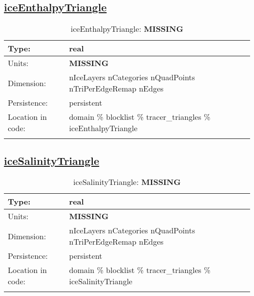 \subsection[iceEnthalpyTriangle]{\hyperref[sec:var_tab_tracer_triangles]{iceEnthalpyTriangle}}
\label{subsec:var_sec_tracer_triangles_iceEnthalpyTriangle}
\begin{center}
\begin{longtable}{| p{2.0in} | p{4.0in} |}
        \hline 
        Type: & real \\
        \hline 
        Units: & {\bf \color{red} MISSING} \\
        \hline 
        Dimension: & nIceLayers nCategories nQuadPoints nTriPerEdgeRemap nEdges \\
        \hline 
        Persistence: & persistent \\
        \hline 
         Location in code: & domain \% blocklist \% tracer\_triangles \% iceEnthalpyTriangle \\
         \hline 
    \caption{iceEnthalpyTriangle: {\bf \color{red} MISSING}}
\end{longtable}
\end{center}
\subsection[iceSalinityTriangle]{\hyperref[sec:var_tab_tracer_triangles]{iceSalinityTriangle}}
\label{subsec:var_sec_tracer_triangles_iceSalinityTriangle}
\begin{center}
\begin{longtable}{| p{2.0in} | p{4.0in} |}
        \hline 
        Type: & real \\
        \hline 
        Units: & {\bf \color{red} MISSING} \\
        \hline 
        Dimension: & nIceLayers nCategories nQuadPoints nTriPerEdgeRemap nEdges \\
        \hline 
        Persistence: & persistent \\
        \hline 
         Location in code: & domain \% blocklist \% tracer\_triangles \% iceSalinityTriangle \\
         \hline 
    \caption{iceSalinityTriangle: {\bf \color{red} MISSING}}
\end{longtable}
\end{center}
